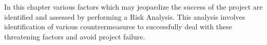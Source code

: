 In this chapter various factors which may jeopardize the success of the project are identified and assessed by performing a Risk Analysis. This analysis involves identification of various countrermeasures to successfully deal with these threatening factors and avoid project failure.



